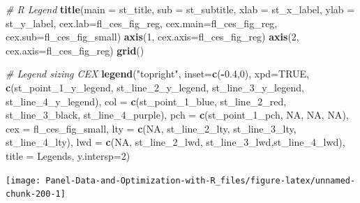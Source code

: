 \documentclass[
]{book}
\newenvironment{Shaded}{\begin{snugshade}}{\end{snugshade}}
\newcommand{\CommentTok}[1]{\textcolor[rgb]{0.56,0.35,0.01}{\textit{#1}}}
\newcommand{\DataTypeTok}[1]{\textcolor[rgb]{0.13,0.29,0.53}{#1}}
\newcommand{\DecValTok}[1]{\textcolor[rgb]{0.00,0.00,0.81}{#1}}
\newcommand{\FloatTok}[1]{\textcolor[rgb]{0.00,0.00,0.81}{#1}}
\newcommand{\KeywordTok}[1]{\textcolor[rgb]{0.13,0.29,0.53}{\textbf{#1}}}
\newcommand{\NormalTok}[1]{#1}
\newcommand{\OperatorTok}[1]{\textcolor[rgb]{0.81,0.36,0.00}{\textbf{#1}}}
\newcommand{\OtherTok}[1]{\textcolor[rgb]{0.56,0.35,0.01}{#1}}
\newcommand{\StringTok}[1]{\textcolor[rgb]{0.31,0.60,0.02}{#1}}
\begin{document}
\begin{Shaded}
\begin{Highlighting}[]
\CommentTok{\# R Legend}
\KeywordTok{title}\NormalTok{(}\DataTypeTok{main =}\NormalTok{ st\_title, }\DataTypeTok{sub =}\NormalTok{ st\_subtitle, }\DataTypeTok{xlab =}\NormalTok{ st\_x\_label, }\DataTypeTok{ylab =}\NormalTok{ st\_y\_label,}
      \DataTypeTok{cex.lab=}\NormalTok{fl\_ces\_fig\_reg,}
      \DataTypeTok{cex.main=}\NormalTok{fl\_ces\_fig\_reg,}
      \DataTypeTok{cex.sub=}\NormalTok{fl\_ces\_fig\_small)}
\KeywordTok{axis}\NormalTok{(}\DecValTok{1}\NormalTok{, }\DataTypeTok{cex.axis=}\NormalTok{fl\_ces\_fig\_reg)}
\KeywordTok{axis}\NormalTok{(}\DecValTok{2}\NormalTok{, }\DataTypeTok{cex.axis=}\NormalTok{fl\_ces\_fig\_reg)}
\KeywordTok{grid}\NormalTok{()}

\CommentTok{\# Legend sizing CEX}
\KeywordTok{legend}\NormalTok{(}\StringTok{"topright"}\NormalTok{,}
       \DataTypeTok{inset=}\KeywordTok{c}\NormalTok{(}\OperatorTok{{-}}\FloatTok{0.4}\NormalTok{,}\DecValTok{0}\NormalTok{),}
       \DataTypeTok{xpd=}\OtherTok{TRUE}\NormalTok{,}
       \KeywordTok{c}\NormalTok{(st\_point\_}\DecValTok{1}\NormalTok{\_y\_legend, st\_line\_}\DecValTok{2}\NormalTok{\_y\_legend, st\_line\_}\DecValTok{3}\NormalTok{\_y\_legend, st\_line\_}\DecValTok{4}\NormalTok{\_y\_legend),}
       \DataTypeTok{col =} \KeywordTok{c}\NormalTok{(st\_point\_}\DecValTok{1}\NormalTok{\_blue, st\_line\_}\DecValTok{2}\NormalTok{\_red, st\_line\_}\DecValTok{3}\NormalTok{\_black, st\_line\_}\DecValTok{4}\NormalTok{\_purple),}
       \DataTypeTok{pch =} \KeywordTok{c}\NormalTok{(st\_point\_}\DecValTok{1}\NormalTok{\_pch, }\OtherTok{NA}\NormalTok{, }\OtherTok{NA}\NormalTok{, }\OtherTok{NA}\NormalTok{),}
       \DataTypeTok{cex =}\NormalTok{ fl\_ces\_fig\_small,}
       \DataTypeTok{lty =} \KeywordTok{c}\NormalTok{(}\OtherTok{NA}\NormalTok{, st\_line\_}\DecValTok{2}\NormalTok{\_lty, st\_line\_}\DecValTok{3}\NormalTok{\_lty, st\_line\_}\DecValTok{4}\NormalTok{\_lty),}
       \DataTypeTok{lwd =} \KeywordTok{c}\NormalTok{(}\OtherTok{NA}\NormalTok{, st\_line\_}\DecValTok{2}\NormalTok{\_lwd, st\_line\_}\DecValTok{3}\NormalTok{\_lwd,st\_line\_}\DecValTok{4}\NormalTok{\_lwd),}
       \DataTypeTok{title =} \StringTok{\textquotesingle{}Legends\textquotesingle{}}\NormalTok{,}
       \DataTypeTok{y.intersp=}\DecValTok{2}\NormalTok{)}
\end{Highlighting}
\end{Shaded}

\begin{center}\texttt{[image: Panel-Data-and-Optimization-with-R\_files/figure-latex/unnamed-chunk-200-1]} \end{center}
\end{document}
